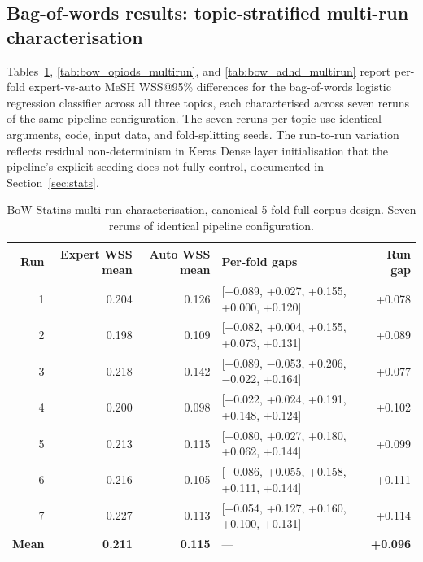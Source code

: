 \documentclass{article}
\begin{document}
\subsection{Bag-of-words results: topic-stratified multi-run characterisation}\label{sec:bow-results}

Tables~\ref{tab:bow_statins_multirun}, \ref{tab:bow_opiods_multirun}, and \ref{tab:bow_adhd_multirun} report per-fold expert-vs-auto MeSH WSS@95\% differences for the bag-of-words logistic regression classifier across all three topics, each characterised across seven reruns of the same pipeline configuration. The seven reruns per topic use identical arguments, code, input data, and fold-splitting seeds. The run-to-run variation reflects residual non-determinism in Keras Dense layer initialisation that the pipeline's explicit seeding does not fully control, documented in Section~\ref{sec:stats}.

\begin{table}[t]
\centering
\small
\begin{tabular}{rrrlr}
\toprule
Run & Expert WSS mean & Auto WSS mean & Per-fold gaps & Run gap \\
\midrule
1 & 0.204 & 0.126 & [+0.089, +0.027, +0.155, +0.000, +0.120] & +0.078 \\
2 & 0.198 & 0.109 & [+0.082, +0.004, +0.155, +0.073, +0.131] & +0.089 \\
3 & 0.218 & 0.142 & [+0.089, $-$0.053, +0.206, $-$0.022, +0.164] & +0.077 \\
4 & 0.200 & 0.098 & [+0.022, +0.024, +0.191, +0.148, +0.124] & +0.102 \\
5 & 0.213 & 0.115 & [+0.080, +0.027, +0.180, +0.062, +0.144] & +0.099 \\
6 & 0.216 & 0.105 & [+0.086, +0.055, +0.158, +0.111, +0.144] & +0.111 \\
7 & 0.227 & 0.113 & [+0.054, +0.127, +0.160, +0.100, +0.131] & +0.114 \\
\midrule
\textbf{Mean} & \textbf{0.211} & \textbf{0.115} & --- & \textbf{+0.096} \\
\bottomrule
\end{tabular}
\caption{BoW Statins multi-run characterisation, canonical 5-fold full-corpus design. Seven reruns of identical pipeline configuration.}
\label{tab:bow_statins_multirun}
\end{table}
\end{document}

